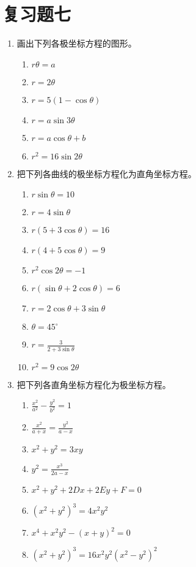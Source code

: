 \section*{复习题七}
\begin{enumerate}
    \item 画出下列各极坐标方程的图形。
\begin{multicols}{2}
    \begin{enumerate}
        \item $r\theta =a$
        \item $r=2\theta$
        \item $r=5(1-\cos\theta )$
        \item $r=a\sin3\theta$
        \item $r=a\cos\theta +b$
        \item $r^2=16\sin 2\theta$
    \end{enumerate}
\end{multicols}

\item 把下列各曲线的极坐标方程化为直角坐标方程。
\begin{multicols}{2}
\begin{enumerate}
\item $r\sin\theta =10$
\item $r=4\sin\theta$
\item $r(5+3\cos\theta )=16$
\item $r(4+5\cos\theta )=9$
\item $r^2\cos2\theta =-1$
\item $r(\sin\theta +2\cos\theta )=6$
\item $r=2\cos\theta +3\sin\theta $
\item $\theta =45^{\circ}$
\item $r=\frac{3}{2+3\sin\theta}$ 
\item $r^2=9\cos2\theta $
\end{enumerate}
\end{multicols}

\item 把下列各直角坐标方程化为极坐标方程。
\begin{multicols}{2}
  \begin{enumerate}
\item $\frac{x^2}{a^2}-\frac{y^2}{b^2}=1$
\item $\frac{x^2}{a+x}=\frac{y^2}{a-x}$
\item $x^2+y^2=3xy$
\item $y^2=\frac{x^3}{2a-x}$
\item $x^2+y^2+2Dx+2Ey+F=0$
\item $(x^2+y^2)^3=4x^2y^2$
\item $x^4+x^2y^2-(x+y)^2=0$
\item $(x^2+y^2)^3=16x^2y^2(x^2-y^2)^2$
\end{enumerate}  
\end{multicols}



\end{enumerate}
